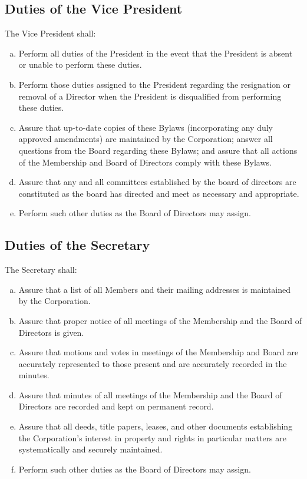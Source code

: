 \subsection{Duties of the Vice President}
The Vice President shall:
\begin{enumerate}[a.]
\item Perform all duties of the President in the event that the
  President is absent or unable to perform these duties.
\item Perform those duties assigned to the President regarding the
  resignation or removal of a Director when the President is
  disqualified from performing these duties.
\item Assure that up-to-date copies of these Bylaws (incorporating any
  duly approved amendments) are maintained by the Corporation; answer
  all questions from the Board regarding these Bylaws; and assure that
  all actions of the Membership and Board of Directors comply with
  these Bylaws.
\item Assure that any and all committees established by the board of
  directors are constituted as the board has directed and meet as
  necessary and appropriate.
\item Perform such other duties as the Board of Directors may assign.
\end{enumerate}

\subsection{Duties of the Secretary}
The Secretary shall:
\begin{enumerate}[a.]
\item Assure that a list of all Members and their mailing addresses is
  maintained by the Corporation.
\item Assure that proper notice of all meetings of the Membership and
  the Board of Directors is given.
\item Assure that motions and votes in meetings of the Membership and
  Board are accurately represented to those present and are accurately
  recorded in the minutes.
\item Assure that minutes of all meetings of the Membership and the
  Board of Directors are recorded and kept on permanent record.
\item Assure that all deeds, title papers, leases, and other documents
  establishing the Corporation’s interest in property and rights in
  particular matters are systematically and securely maintained.
\item Perform such other duties as the Board of Directors may assign.
\end{enumerate}

